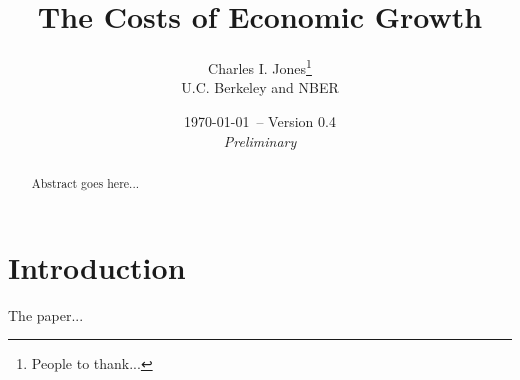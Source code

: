 \documentclass[12pt,twoside]{modern-chad}
\begin{document}


\begin{spacing}{0.9}
\begin{titlepage}

\title{The Costs of Economic Growth}

\author{\large Charles I. Jones\thanks{People to thank...}\\ {U.C. Berkeley and NBER}
   }

\date{\small \today\ -- Version 0.4\\ {\it Preliminary}}
\maketitle
\thispagestyle{empty}

\vspace{-0.3in}

\begin{abstract}
   Abstract goes here...
\end{abstract}

\end{titlepage}
\end{spacing}

\section{Introduction}

The paper...

{\small
%
}
\end{document}
